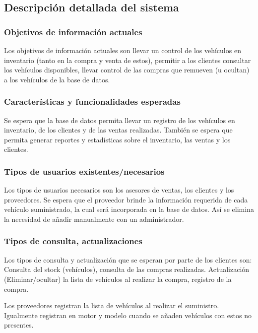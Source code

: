 \documentclass[12pt]{article}
\begin{document}
\subsection{Descripci\'on detallada del sistema}

\subsubsection{Objetivos de información actuales}

Los objetivos de información actuales son llevar un control de los vehículos en inventario (tanto en la compra y venta de estos), permitir a los clientes consultar los vehículos disponibles, llevar control de las compras que remueven (u ocultan) a los vehículos de la base de datos.

\subsubsection{Caracter\'isticas y funcionalidades esperadas}

Se espera que la base de datos permita llevar un registro de los vehículos en inventario, de los clientes y de las ventas realizadas. También se espera que permita generar reportes y estadísticas sobre el inventario, las ventas y los clientes.

\subsubsection{Tipos de usuarios existentes/necesarios}

Los tipos de usuarios necesarios son los asesores de ventas, los clientes y los proveedores. Se espera que el proveedor brinde la información requerida de cada vehículo suministrado, la cual será incorporada en la base de datos. Así se elimina la necesidad de añadir manualmente con un administrador.

\subsubsection{Tipos de consulta, actualizaciones}

Los tipos de consulta y actualización que se esperan por parte de los clientes son: Consulta del stock (vehículos),  consulta de las compras realizadas. Actualización (Eliminar/ocultar) la lista de vehículos al realizar la compra, registro de la compra.

Los proveedores registran la lista de vehículos al realizar el suministro. Igualmente registran en motor y modelo cuando se añaden vehículos con estos no presentes.
\end{document}
